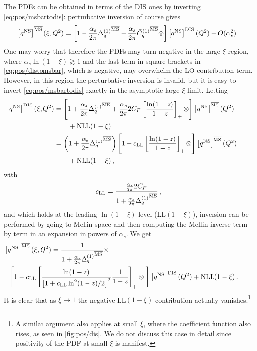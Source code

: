 The \msbar{} PDFs can be obtained in terms of the DIS ones by inverting
\cref{eq:pos/msbartodis}: perturbative inversion of course gives
\begin{equation}\label{eq:pos/distomsbar}
\left[{q^{{\textrm{NS}}}}\right]^{{\overline{\textrm{MS}}}}(\xi,Q^2)=
\left[1-\frac{\alpha_s}{2\pi} {\Delta^{(1)}_q}^{{\overline{\textrm{MS}}}}
  -\frac{\alpha_s}{2\pi}  {\bar
    C^{(1)}_q{}}^{{\overline{\textrm{MS}}}}\otimes\right]\left[{q^{{\textrm{NS}}}}\right]^{\textrm{DIS}}(Q^2)
+O(\alpha_s^2) \,.
\end{equation}
One may worry that therefore the \msbar{} PDFs may turn negative in the
large $\xi$ region, where $\alpha_s\ln(1-\xi)\gtrsim 1$ and the last term
in square brackets in \cref{eq:pos/distomsbar}, which is negative, may overwhelm the LO
contribution 
term. However, in this region the perturbative
inversion is invalid, but it is easy to invert
\cref{eq:pos/msbartodis} exactly in the asymptotic large $\xi$ limit.
Letting
\begin{align}\label{eq:pos/msbartodisp}
    \hspace{-20pt}\left[{q^{\NS}}\right]^{\textrm{DIS}}(\xi,Q^2)&=
\left[1+\frac{\alpha_s}{2\pi} {\Delta^{(1)}_q}^{\mmsbar}
  +\frac{\alpha_s}{2\pi} 2C_F\left[\frac{\ln(1-z)}{1-z}\right]_+
  \otimes\right]\left[{q^{\NS}}\right]^{\mmsbar}(Q^2)\nonumber\\
    &\qquad+ \hbox{NLL}(1-\xi)\\
\label{eq:pos/msbartodisp1}
    &= \left(1+\frac{\alpha_s}{2\pi} {\Delta^{(1)}_q}^{\mmsbar}\right) 
\left[1+c_{\textrm{LL}}\left[\frac{\ln(1-z)}{1-z}\right]_+
\otimes\right]\left[{q^{\NS}}\right]^{\mmsbar}(Q^2)\nonumber\\
    &\qquad+ \hbox{NLL}(1-\xi) \,,
\end{align}
with
\begin{equation}
    \label{eq:pos/msbartodiscoeff}
    c_{\textrm{LL}} = \frac{\frac{\alpha_s}{2\pi} 2C_F}{1+\frac{\alpha_s}{2\pi} {\Delta^{(1)}_q}^{{\overline{\textrm{MS}}}}} \,, 
\end{equation}
and which holds at the leading $\ln(1-\xi)$ level (LL$(1-\xi)$),
inversion can be performed by going to Mellin space and then computing
the Mellin inverse term by term in an expansion in powers of $\alpha_s$.
We get
\begin{align}\label{eq:pos/distomsbarllx}
    \hspace*{-20pt} \left[{q^{\NS}}\right]^{\mmsbar}(\xi,Q^2) &= \frac{1}{1+\frac{\alpha_s}{2\pi} {\Delta^{(1)}_q}^{\mmsbar}} \times \nonumber\\
    &\hspace*{-60pt}\Bigg[1 -c_{\textrm{LL}} \left[ \frac{\ln(1-z)}{\left[1+c_{\textrm{LL}}\ln^2(1-z)/2\right]^2}  \frac{1}{1-z}\right]_+
\otimes\Bigg]\left[{q^{\NS}}\right]^{\textrm{DIS}}(Q^2) + \hbox{NLL}(1-\xi) \,.
\end{align}
It is clear that as $\xi\to 1$ the negative LL$(1-\xi)$ contribution
actually vanishes.\footnote{A similar argument also applies at small
  $\xi$, where the coefficient function also rises, as seen in
  \cref{fig:pos/dis}. We do not discuss this case in detail since
  positivity of the \msbar{} PDF at small $\xi$ is manifest.}




